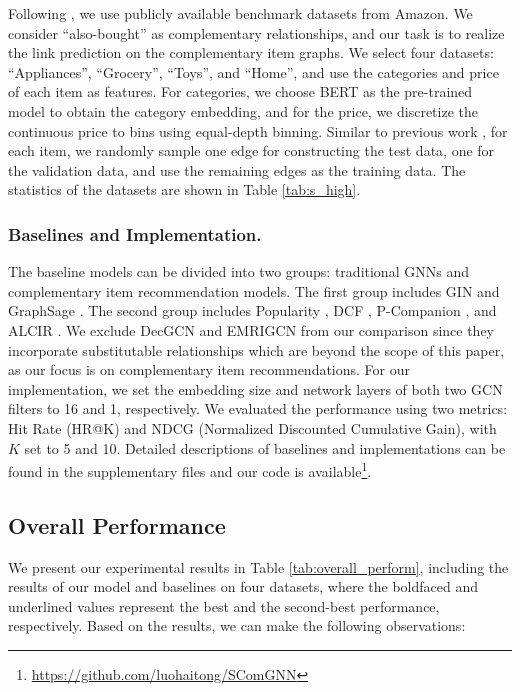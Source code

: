 \documentclass[letterpaper]{article} %
\begin{document}
Following \cite{liu2020decoupled, hao2020p, bibas2023semi}, we use publicly available benchmark datasets from Amazon. We consider ``also-bought'' as complementary relationships, and our task is to realize the link prediction on the complementary item graphs. We select four datasets: ``Appliances'', ``Grocery'', ``Toys'', and ``Home'', and use the categories and price of each item as features. For categories, we choose BERT \cite{vaswani2017attention} as the pre-trained model to obtain the category embedding, and for the price, we discretize the continuous price to bins using equal-depth binning. Similar to previous work \cite{liu2020decoupled}, for each item, we randomly sample one edge for constructing the test data, one for the validation data, and use the remaining edges as the training data. The statistics of the datasets are shown in Table \ref{tab:s_high}.

 \subsubsection{Baselines and Implementation.}
 The baseline models can be divided into two groups: traditional GNNs and complementary item recommendation models. The first group includes GIN \cite{xu2018powerful} and GraphSage \cite{hamilton2017inductive}. The second group includes Popularity \cite{bibas2023semi}, DCF \cite{galron2018deep}, P-Companion \cite{hao2020p}, and ALCIR \cite{bibas2023semi}. We exclude DecGCN \cite{liu2020decoupled} and EMRIGCN \cite{chen2023enhanced} from our comparison since they incorporate substitutable relationships which are beyond the scope of this paper, as our focus is on complementary item recommendations. For our implementation, we set the embedding size and network layers of both two GCN filters to 16 and 1, respectively. We evaluated the performance using two metrics: Hit Rate (HR@K) and NDCG (Normalized Discounted Cumulative Gain), with $K$ set to 5 and 10. Detailed descriptions of baselines and implementations can be found in the supplementary files and our code is available\footnote{\url{https://github.com/luohaitong/SComGNN}}.




\subsection{Overall Performance}
We present our experimental results in Table \ref{tab:overall_perform}, including the results of our model and baselines on four datasets, where the boldfaced and underlined values represent the best and the second-best performance, respectively. Based on the results, we can make the following observations:
\end{document}
